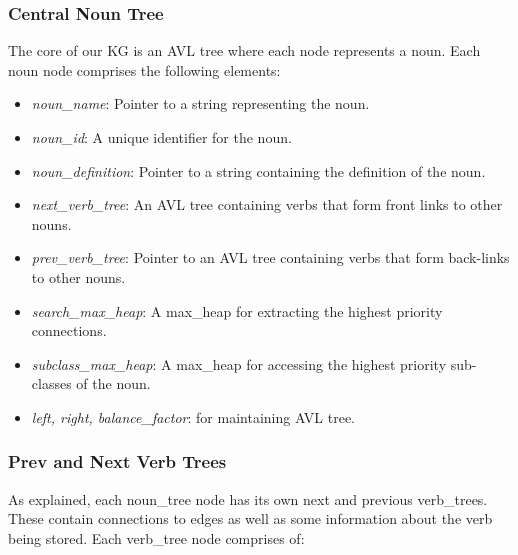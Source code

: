 \documentclass[conference]{IEEEtran}
\begin{document}
\subsubsection{\textbf{Central Noun Tree}}
The core of our KG is an AVL tree where each node represents a noun. Each noun node comprises the following elements:
\begin{itemize}

    \item \textit{noun\_name}: Pointer to a string representing the noun.
    \item \textit{noun\_id}: A unique identifier for the noun.
    \item \textit{noun\_definition}: Pointer to a string containing the definition of the noun.
    \item \textit{next\_verb\_tree}: An AVL tree containing verbs that form front links to other nouns.
    \item \textit{prev\_verb\_tree}: Pointer to an AVL tree containing verbs that form back-links to other nouns.
    \item \textit{search\_max\_heap}: A max\_heap for extracting the highest priority connections.
    \item \textit{subclass\_max\_heap}: A max\_heap for accessing the highest priority sub-classes of the noun.
    \item \textit{left, right, balance\_factor}: for maintaining AVL tree. 
    
\end{itemize}




\subsubsection{\textbf{Prev and Next Verb Trees}}
As explained, each noun\_tree node has its own next and previous verb\_trees. These contain connections to edges as well as some information about the verb being stored. Each verb\_tree node comprises of:
\end{document}
